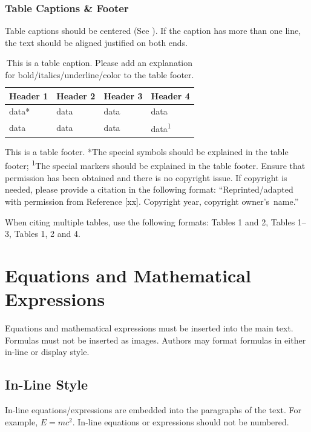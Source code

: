 \documentclass[journal,article,submit,moreauthors,pdftex]{Definitions/tsp}
\begin{document}
\subsubsection{Table Captions \& Footer} \label{sect:s3dot2dot2}
Table captions should be centered (See ). If the caption has more than one line, the text should be aligned justified on both ends.

\begin{table}[H] 
\tablesize{\footnotesize}
\caption{This is a table caption. Please add an explanation for bold/italics/underline/color to the table footer.}
\label{tabref:table-1}
\begin{tabularx}{\textwidth}{CCCC}
\toprule
\textbf{Header 1} & \textbf{Header 2} & \textbf{Header 3} & \textbf{Header 4}\\
\midrule
data* & data & data & data\\
data & data & data & data\textsuperscript{1}\\
\bottomrule
\end{tabularx}
\footnotesize{This is a table footer. *The special symbols should be explained in the table footer; \textsuperscript{1}The special markers should be explained in the table footer. Ensure that permission has been obtained and there is no copyright issue. If copyright is needed, please provide a citation in the following format: “Reprinted/adapted with permission from Reference [xx]. Copyright year, copyright owner’s~name.”}
\end{table}

When citing multiple tables, use the following formats: Tables 1 and 2, Tables 1--3, Tables 1, 2 and 4.


\section{Equations and Mathematical Expressions} \label{sect:s4}
Equations and mathematical expressions must be inserted into the main text.  Formulas must not be inserted as images. Authors may format formulas in either in-line or display style.

\subsection{In-Line Style}\label{sect:s4dot1}
In-line equations/expressions are embedded into the paragraphs of the text. For example,  $E = mc^2$. In-line equations or expressions should not be numbered.
\end{document}
